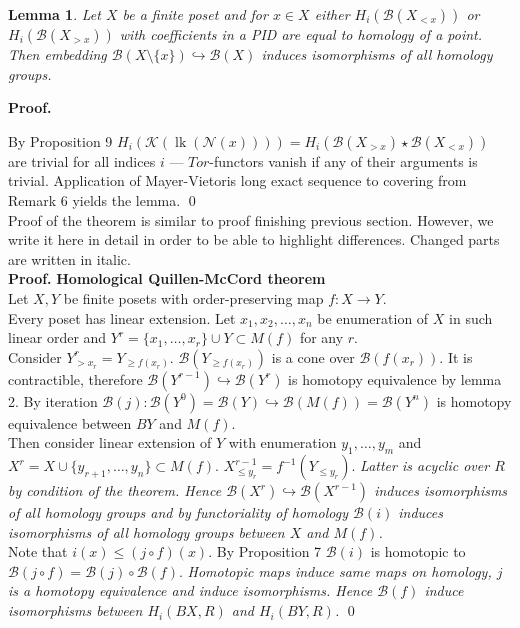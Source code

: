 \documentclass[a4paper, 12pt]{article}
\newtheorem{lemma}{Lemma}
\theoremstyle{definition}
\theoremstyle{remark}
\newenvironment{pf}{\noindent\textbf{Proof.}}{\qed}
\renewcommand{\leq}{\leqslant}
\renewcommand{\geq}{\geqslant}
\begin{document}
\begin{lemma}
  Let $X$ be a finite poset and for $x \in X$ either $H_i(\mathcal{B}(X_{< x}))$ or $H_i(\mathcal{B}(X_{> x}))$ with coefficients in a PID are equal to homology of a point. Then embedding $\mathcal{B}(X \setminus \{x\}) \hookrightarrow \mathcal{B}(X)$ induces isomorphisms of all homology groups.
\end{lemma}

\begin{pf} ~ \par
  By Proposition 9 $H_i(\mathcal{K}(\operatorname{lk}(\mathcal{N}(x)))) = H_i(\mathcal{B}(X_{>x}) \star \mathcal{B}(X_{<x}))$ are trivial for all indices $i$ --- $Tor$-functors vanish if any of their arguments is trivial.
  Application of Mayer-Vietoris long exact sequence to covering from Remark 6 yields the lemma.
\end{pf}\\

Proof of the theorem is similar to proof finishing previous section. However, we write it here in detail in order to be able to highlight differences. Changed parts are written in italic.\\

\begin{pf} \textbf{Homological Quillen-McCord theorem}\\
Let $X, Y$ be finite posets with order-preserving map $f : X \to Y$.\\

Every poset has linear extension. Let $x_1, x_2, \ldots, x_n$ be enumeration of $X$ in such linear order and $Y^r = \{x_1,\ldots,x_r\} \cup Y \subset M(f)$ for any $r$.\\

Consider $Y^r_{>x_r} = Y_{\geq f(x_r)}$. $\mathcal{B}(Y_{\geq f(x_r)})$ is a cone over $\mathcal{B}(f(x_r))$. It is contractible, therefore $\mathcal{B}(Y^{r-1}) \hookrightarrow \mathcal{B}(Y^{r})$ is homotopy equivalence by lemma 2. By iteration $\mathcal{B}(j) : \mathcal{B}(Y^{0}) = \mathcal{B}(Y) \hookrightarrow \mathcal{B}(M(f)) = \mathcal{B}(Y^n)$ is homotopy equivalence between $BY$ and $M(f)$.\\

Then consider linear extension of $Y$ with enumeration $y_1,\ldots,y_m$ and $X^r = X \cup \{y_{r+1},\ldots,y_n\} \subset M(f)$. $X^{r-1}_{\leq y_r} = f^{-1}(Y_{\leqslant y_r})$. \textit{Latter is acyclic over $R$ by condition of the theorem. Hence $\mathcal{B}(X^{r}) \hookrightarrow \mathcal{B}(X^{r-1})$ induces isomorphisms of all homology groups and by functoriality of homology $\mathcal{B}(i)$ induces isomorphisms of all homology groups between $X$ and $M(f)$.}\\

Note that $i(x) \leqslant (j \circ f)(x)$. By Proposition 7 $\mathcal{B}(i)$ is homotopic to $\mathcal{B}(j \circ f) = \mathcal{B}(j) \circ \mathcal{B}(f)$. \textit{Homotopic maps induce same maps on homology, $j$ is a homotopy equivalence and induce isomorphisms. Hence $\mathcal{B}(f)$ induce isomorphisms between $H_i(BX,R)$ and $H_i(BY,R)$.}
\end{pf}\\
\end{document}
